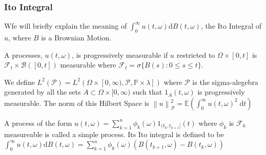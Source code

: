 \documentclass[11pt]{beamer}
\numberwithin{equation}{section}
\newcommand{\E}{\mathbb{E}}
\newcommand{\Norm}[1]{\left\|  #1   \right\|}
\newcommand{\ud}{\ensuremath{\mathrm{d}}}
\begin{document}
\begin{frame}[t]
	\frametitle{Ito Integral}

Wfe will briefly explain the meaning of $\int_0^\infty u(t,\omega) \ud B(t,\omega)$, the Ito Integral of $u$, where $B$ is a Brownian Motion.

\begin{definition}
	A processes, $u(t,\omega)$, is progressively measurable if $u$ restricted to $\Omega \times [0,t]$ is $\mathcal{F}_t \times \mathscr{B}([0,t])$ measurable where $\mathcal{F}_t = \sigma\{B(s) : 0 \le s \le t \}  $.
\end{definition}

\begin{definition}
We define $L^2(\mathscr{P}) = L^2(\Omega \times [0, \infty), \mathscr{P}, \mathbb{P}\times \lambda ])$ where $\mathscr{P}$ is the sigma-alegebra generated by all the sets $A \subset \Omega \times [0, \infty)$ such that $1_A(t,\omega)$ is progressively measurable. The norm of this Hilbert Space is $\Norm{u}_{\mathscr{P}}^2 = \E \left( \int_0^\infty u(t,\omega)^2 \; \ud t \right)$
\end{definition}

\begin{definition}
	A process of the form $u(t,\omega) = \sum_{k=1}^n \phi_k(\omega) 1_{(t_k,t_{k+1}]}(t)$ where $\phi_k$ is $\mathcal{F}_k$ measureable is called a simple process. Its Ito integral is defined to be $\int_0^\infty u(t,\omega) \ud B(t,\omega) = \sum_{k=1}^n \phi_k(\omega)(B(t_{k+1},\omega)-B(t_k, \omega))$
\end{definition}
\end{frame}
\end{document}
